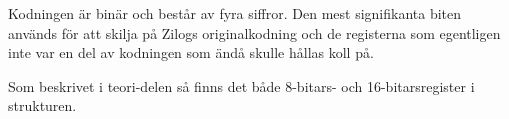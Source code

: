 \documentclass{article}
\begin{document}
Kodningen är binär och består av fyra siffror. Den mest signifikanta biten
används för att skilja på Zilogs originalkodning och de registerna som
egentligen inte var en del av kodningen som ändå skulle hållas koll på.

Som beskrivet i teori-delen så finns det både 8-bitars- och 16-bitarsregister i
strukturen.



\clearpage
\printbibliography[heading=bibintoc]
\end{document}
